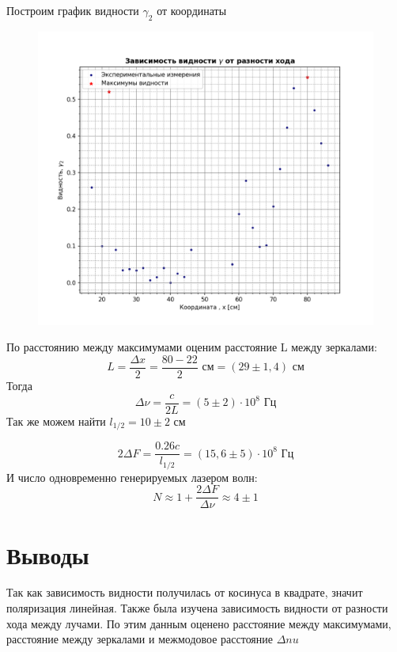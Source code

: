 \documentclass[a4paper, 12pt]{article}
\begin{document}
Построим график видности $\gamma_2$ от координаты
\begin{figure}[H]
    \centering
    \includegraphics[width=1\textwidth]{plot4--5--2-2.png}
    \label{fig:plot2}
\end{figure}
По расстоянию между максимумами оценим расстояние L между зеркалами:
\begin{equation*}
	L = \frac{\Delta x}{2} = \frac{80 - 22}{2} \text{ см} = (29 \pm 1,4) \text{ см}
\end{equation*}
Тогда
\begin{equation*}
	\Delta \nu = \frac{c}{2L} = (5 \pm 2) \cdot 10^8 \text{ Гц}
\end{equation*}
Так же можем найти $l_{1/2} = 10 \pm 2 \text{ см}$

\begin{equation*}
	2 \Delta F = \frac{0.26c}{l_{1/2}} = (15,6 \pm 5) \cdot 10^8 \text{ Гц}
\end{equation*}
И число одновременно генерируемых лазером волн:
\begin{equation*}
	N \approx 1 + \frac{2\Delta F}{\Delta \nu} \approx 4 \pm 1
\end{equation*}

\section{Выводы}

Так как зависимость видности получилась от косинуса в квадрате, значит поляризация линейная.
Также была изучена зависимость видности от разности хода между лучами. По этим данным оценено расстояние между максимумами, расстояние между зеркалами 
и межмодовое расстояние $\Delta nu$
\end{document}
